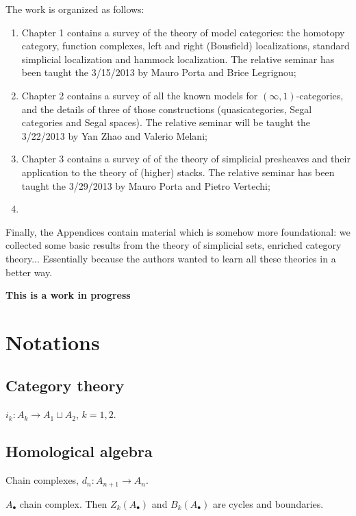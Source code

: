 \documentclass[a4paper]{memoir}
\theoremstyle{definition}
\theoremstyle{definition}
\theoremstyle{remark}
\begin{document}
The work is organized as follows:

\begin{enumerate}
\item Chapter 1 contains a survey of the theory of model categories: the homotopy category, function complexes, left and right (Bousfield) localizations, standard simplicial localization and hammock localization. The relative seminar has been taught the 3/15/2013 by Mauro Porta and Brice Legrignou;
\item Chapter 2 contains a survey of all the known models for $(\infty,1)$-categories, and the details of three of those constructions (quasicategories, Segal categories and Segal spaces). The relative seminar will be taught the 3/22/2013 by Yan Zhao and Valerio Melani;
\item Chapter 3 contains a survey of of the theory of simplicial presheaves and their application to the theory of (higher) stacks. The relative seminar has been taught the 3/29/2013 by Mauro Porta and Pietro Vertechi;
\item
\end{enumerate}

Finally, the Appendices contain material which is somehow more foundational: we collected some basic results from the theory of simplicial sets, enriched category theory... Essentially because the authors wanted to learn all these theories in a better way.

{\bfseries This is a work in progress}

\listoftodos

\section*{Notations}

\subsection*{Category theory}

$i_k \colon A_k \to A_1 \sqcup A_2$, $k = 1,2$.

\subsection*{Homological algebra}

Chain complexes, $d_n \colon A_{n+1} \to A_n$.

$A_\bullet$ chain complex. Then $Z_k(A_\bullet)$ and $B_k(A_\bullet)$ are cycles and boundaries.
\end{document}
